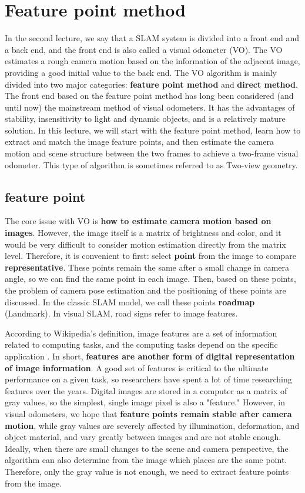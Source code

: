 \section{Feature point method}
In the second lecture, we say that a SLAM system is divided into a front end and a back end, and the front end is also called a visual odometer (VO). The VO estimates a rough camera motion based on the information of the adjacent image, providing a good initial value to the back end. The VO algorithm is mainly divided into two major categories: \textbf{feature point method} and \textbf{direct method}. The front end based on the feature point method has long been considered (and until now) the mainstream method of visual odometers. It has the advantages of stability, insensitivity to light and dynamic objects, and is a relatively mature solution. In this lecture, we will start with the feature point method, learn how to extract and match the image feature points, and then estimate the camera motion and scene structure between the two frames to achieve a two-frame visual odometer. This type of algorithm is sometimes referred to as Two-view geometry.

\subsection{feature point}
The core issue with VO is \textbf{how to estimate camera motion based on images}. However, the image itself is a matrix of brightness and color, and it would be very difficult to consider motion estimation directly from the matrix level. Therefore, it is convenient to first: select \textbf{point} from the image to compare \textbf{representative}. These points remain the same after a small change in camera angle, so we can find the same point in each image. Then, based on these points, the problem of camera pose estimation and the positioning of these points are discussed. In the classic SLAM model, we call these points \textbf{roadmap} (Landmark). In visual SLAM, road signs refer to image features.

According to Wikipedia's definition, image features are a set of information related to computing tasks, and the computing tasks depend on the specific application \textsuperscript{\cite{wiki:featurecv}}. In short, \textbf{features are another form of digital representation of image information}. A good set of features is critical to the ultimate performance on a given task, so researchers have spent a lot of time researching features over the years. Digital images are stored in a computer as a matrix of gray values, so the simplest, single image pixel is also a "feature." However, in visual odometers, we hope that \textbf{feature points remain stable after camera motion}, while gray values ​​are severely affected by illumination, deformation, and object material, and vary greatly between images and are not stable enough. Ideally, when there are small changes to the scene and camera perspective, the algorithm can also determine from the image which places are the same point. Therefore, only the gray value is not enough, we need to extract feature points from the image.

